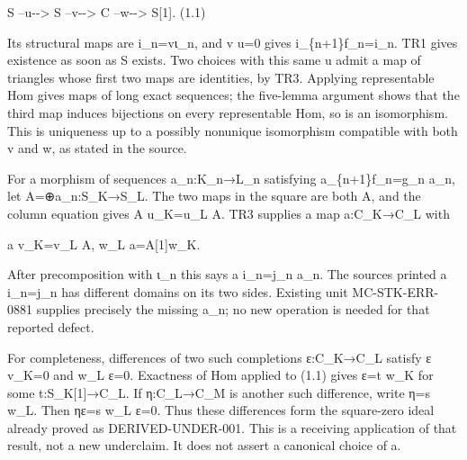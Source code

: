 S --u-\allowbreak{}-> S --v-\allowbreak{}-> C --w-\allowbreak{}-> S[1]\allowbreak{}. (1.1)\allowbreak{}

Its structural maps are i\_\allowbreak{}n\allowbreak{}=vι\_\allowbreak{}n,\allowbreak{} and v u\allowbreak{}=0 gives i\_\allowbreak{}\{n\allowbreak{}+1\}f\_\allowbreak{}n\allowbreak{}=i\_\allowbreak{}n. TR1 gives existence as soon as S exists. Two choices with this same u admit a map of triangles whose first two maps are identities,\allowbreak{} by TR3. Applying representable Hom gives maps of long exact sequences; the five-lemma argument shows that the third map induces bijections on every representable Hom,\allowbreak{} so is an isomorphism. This is uniqueness up to a possibly nonunique isomorphism compatible with both v and w,\allowbreak{} as stated in the source.

For a morphism of sequences a\_\allowbreak{}n:\allowbreak{}K\_\allowbreak{}n\allowbreak{}→L\_\allowbreak{}n satisfying a\_\allowbreak{}\{n\allowbreak{}+1\}f\_\allowbreak{}n\allowbreak{}=g\_\allowbreak{}n a\_\allowbreak{}n,\allowbreak{} let A\allowbreak{}=\allowbreak{}⊕a\_\allowbreak{}n:\allowbreak{}S\_\allowbreak{}K\allowbreak{}→S\_\allowbreak{}L. The two maps in the square are both A,\allowbreak{} and the column equation gives A u\_\allowbreak{}K\allowbreak{}=u\_\allowbreak{}L A. TR3 supplies a map a:\allowbreak{}C\_\allowbreak{}K\allowbreak{}→C\_\allowbreak{}L with

a v\_\allowbreak{}K\allowbreak{}=v\_\allowbreak{}L A,\allowbreak{} w\_\allowbreak{}L a\allowbreak{}=A[1]\allowbreak{}w\_\allowbreak{}K.

After precomposition with ι\_\allowbreak{}n this says a i\_\allowbreak{}n\allowbreak{}=j\_\allowbreak{}n a\_\allowbreak{}n. The source\textquotesingle s printed a i\_\allowbreak{}n\allowbreak{}=j\_\allowbreak{}n has different domains on its two sides. Existing unit MC-STK-ERR-0881 supplies precisely the missing a\_\allowbreak{}n; no new operation is needed for that reported defect.

For completeness,\allowbreak{} differences of two such completions ε:\allowbreak{}C\_\allowbreak{}K\allowbreak{}→C\_\allowbreak{}L satisfy ε v\_\allowbreak{}K\allowbreak{}=0 and w\_\allowbreak{}L ε\allowbreak{}=0. Exactness of Hom applied to (1.1)\allowbreak{} gives ε\allowbreak{}=t w\_\allowbreak{}K for some t:\allowbreak{}S\_\allowbreak{}K[1]\allowbreak{}\allowbreak{}→C\_\allowbreak{}L. If η:\allowbreak{}C\_\allowbreak{}L\allowbreak{}→C\_\allowbreak{}M is another such difference,\allowbreak{} write η\allowbreak{}=s w\_\allowbreak{}L. Then ηε\allowbreak{}=s w\_\allowbreak{}L ε\allowbreak{}=0. Thus these differences form the square-zero ideal already proved as DERIVED-UNDER-001. This is a receiving application of that result,\allowbreak{} not a new underclaim. It does not assert a canonical choice of a.

